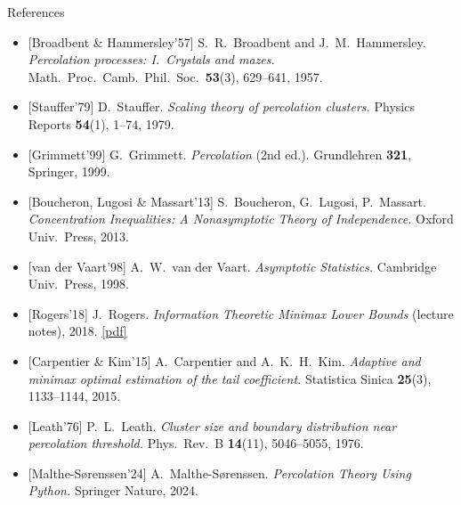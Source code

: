 \documentclass[10pt, aspectratio=169, xcolor={table}]{beamer}
\begin{document}
\begin{frame}{References}
  \footnotesize
  \begin{itemize}\setlength{\itemsep}{3pt}
    \item {}[Broadbent \& Hammersley'57]
          S.~R.~Broadbent and J.~M.~Hammersley.
          \emph{Percolation processes: I.~Crystals and mazes.}
          Math.\ Proc.\ Camb.\ Phil.\ Soc.\ \textbf{53}(3), 629--641, 1957.
    \item {}[Stauffer'79]
          D.~Stauffer.
          \emph{Scaling theory of percolation clusters.}
          Physics Reports \textbf{54}(1), 1--74, 1979.
    \item {}[Grimmett'99]
          G.~Grimmett.
          \emph{Percolation} (2nd ed.).
          Grundlehren \textbf{321}, Springer, 1999.
    \item {}[Boucheron, Lugosi \& Massart'13]
          S.~Boucheron, G.~Lugosi, P.~Massart.
          \emph{Concentration Inequalities: A Nonasymptotic Theory of Independence.}
          Oxford Univ.\ Press, 2013.
    \item {}[van der Vaart'98]
          A.~W.~van der Vaart.
          \emph{Asymptotic Statistics.}
          Cambridge Univ.\ Press, 1998.
    \item {}[Rogers'18]
          J.~Rogers.
          \emph{Information Theoretic Minimax Lower Bounds} (lecture notes), 2018.
          \href{https://jenniferbrennan.github.io/resources/Minimax_Lower_Bound_Notes.pdf}{[pdf]}
    \item {}[Carpentier \& Kim'15]
          A.~Carpentier and A.~K.~H.~Kim.
          \emph{Adaptive and minimax optimal estimation of the tail coefficient.}
          Statistica Sinica \textbf{25}(3), 1133--1144, 2015.
    \item {}[Leath'76]
          P.~L.~Leath.
          \emph{Cluster size and boundary distribution near percolation threshold.}
          Phys.\ Rev.\ B \textbf{14}(11), 5046--5055, 1976.
    \item {}[Malthe-S\o renssen'24]
          A.~Malthe-S\o renssen.
          \emph{Percolation Theory Using Python.}
          Springer Nature, 2024.
  \end{itemize}
\end{frame}
\end{document}

